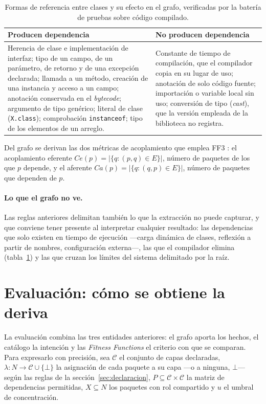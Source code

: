 \begin{table}[H]
\centering
\caption{Formas de referencia entre clases y su efecto en el grafo, verificadas por la batería de pruebas sobre código compilado.}
\label{tab:extraccion}
\footnotesize
\begin{tabularx}{\textwidth}{XX}
\toprule
\textbf{Producen dependencia} & \textbf{No producen dependencia} \\
\midrule
Herencia de clase e implementación de interfaz; tipo de un campo, de un parámetro, de retorno y de una excepción declarada; llamada a un método, creación de una instancia y acceso a un campo; anotación conservada en el \textit{bytecode}; argumento de tipo genérico; literal de clase (\texttt{X.class}); comprobación \texttt{instanceof}; tipo de los elementos de un arreglo. &
Constante de tiempo de compilación, que el compilador copia en su lugar de uso; anotación de solo código fuente; importación o variable local sin uso; conversión de tipo (\textit{cast}), que la versión empleada de la biblioteca no registra. \\
\bottomrule
\end{tabularx}
\end{table}

Del grafo se derivan las dos métricas de acoplamiento que emplea FF3 \citep{Martin2003}: el acoplamiento eferente $Ce(p) = |\{q : (p, q) \in E\}|$, número de paquetes de los que $p$ depende, y el aferente $Ca(p) = |\{q : (q, p) \in E\}|$, número de paquetes que dependen de $p$.

\paragraph{Lo que el grafo no ve.} Las reglas anteriores delimitan también lo que la extracción no puede capturar, y que conviene tener presente al interpretar cualquier resultado: las dependencias que solo existen en tiempo de ejecución ---carga dinámica de clases, reflexión a partir de nombres, configuración externa---, las que el compilador elimina (tabla~\ref{tab:extraccion}) y las que cruzan los límites del sistema delimitado por la raíz.

\section{Evaluación: cómo se obtiene la deriva}
\label{sec:evaluacion}
La evaluación combina las tres entidades anteriores: el grafo aporta los hechos, el catálogo la intención y las \textit{Fitness Functions} el criterio con que se comparan. Para expresarlo con precisión, sea $\mathcal{C}$ el conjunto de capas declaradas, $\lambda : N \rightarrow \mathcal{C} \cup \{\bot\}$ la asignación de cada paquete a su capa ---o a ninguna, $\bot$--- según las reglas de la sección~\ref{sec:declaracion}, $P \subseteq \mathcal{C} \times \mathcal{C}$ la matriz de dependencias permitidas, $X \subseteq N$ los paquetes con rol compartido y $u$ el umbral de concentración.

